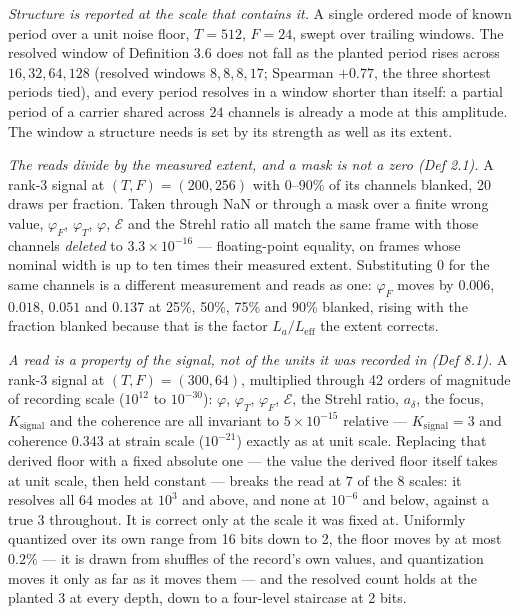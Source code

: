 \documentclass[10pt,letterpaper,twocolumn]{article}
\begin{document}
\emph{Structure is reported at the scale that contains it.} A single ordered mode of known period over a unit noise floor, \(T=512\), \(F=24\), swept over trailing windows. The resolved window of Definition 3.6 does not fall as the planted period rises across \(16,32,64,128\) (resolved windows \(8,8,8,17\); Spearman \(+0.77\), the three shortest periods tied), and every period resolves in a window shorter than itself: a partial period of a carrier shared across \(24\) channels is already a mode at this amplitude. The window a structure needs is set by its strength as well as its extent.

\emph{The reads divide by the measured extent, and a mask is not a zero (Def 2.1).} A rank-3 signal at \((T,F)=(200,256)\) with 0--90\% of its channels blanked, 20 draws per fraction. Taken through NaN or through a mask over a finite wrong value, \(\varphi_F\), \(\varphi_T\), \(\varphi\), \(\mathcal E\) and the Strehl ratio all match the same frame with those channels \emph{deleted} to \(3.3\times10^{-16}\) --- floating-point equality, on frames whose nominal width is up to ten times their measured extent. Substituting \(0\) for the same channels is a different measurement and reads as one: \(\varphi_F\) moves by \(0.006\), \(0.018\), \(0.051\) and \(0.137\) at 25\%, 50\%, 75\% and 90\% blanked, rising with the fraction blanked because that is the factor \(L_a/L_{\mathrm{eff}}\) the extent corrects.

\emph{A read is a property of the signal, not of the units it was recorded in (Def 8.1).} A rank-3 signal at \((T,F)=(300,64)\), multiplied through 42 orders of magnitude of recording scale (\(10^{12}\) to \(10^{-30}\)): \(\varphi\), \(\varphi_T\), \(\varphi_F\), \(\mathcal E\), the Strehl ratio, \(a_\delta\), the focus, \(K_{\mathrm{signal}}\) and the coherence are all invariant to \(5\times10^{-15}\) relative --- \(K_{\mathrm{signal}}=3\) and coherence \(0.343\) at strain scale (\(10^{-21}\)) exactly as at unit scale. Replacing that derived floor with a fixed absolute one --- the value the derived floor itself takes at unit scale, then held constant --- breaks the read at \(7\) of the \(8\) scales: it resolves all \(64\) modes at \(10^{3}\) and above, and none at \(10^{-6}\) and below, against a true \(3\) throughout. It is correct only at the scale it was fixed at. Uniformly quantized over its own range from 16 bits down to 2, the floor moves by at most \(0.2\%\) --- it is drawn from shuffles of the record's own values, and quantization moves it only as far as it moves them --- and the resolved count holds at the planted \(3\) at every depth, down to a four-level staircase at 2 bits.
\end{document}
